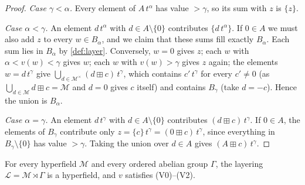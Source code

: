 \documentclass[11pt]{amsart}
\numberwithin{equation}{section}
\newcommand{\hplus}{\boxplus}
\newcommand{\Mas}{\mathcal M}
\newcommand{\Lay}{\mathcal L}
\newcommand{\lt}[2]{#1\,t^{#2}}
\begin{document}
\begin{proof}
\emph{Case $\gamma<\alpha$.} Every element of $\lt{A}{\alpha}$ has value $>\gamma$, so its sum with $z$ is $\{z\}$.

\emph{Case $\alpha<\gamma$.} An element $d\,t^\alpha$ with $d\in A\setminus\{0\}$ contributes $\{d\,t^\alpha\}$. If $0\in A$ we must also add $z$ to every $w\in B_\alpha$, and we claim that these sums fill exactly $B_\alpha$. Each sum lies in $B_\alpha$ by \cref{def:layer}. Conversely, $w=0$ gives $z$; each $w$ with $\alpha<v(w)<\gamma$ gives $w$; each $w$ with $v(w)>\gamma$ gives $z$ again; the elements $w=d\,t^\gamma$ give $\bigcup_{d\in\Mas^\times}\lt{(d\hplus c)}{\gamma}$, which contains $c'\,t^\gamma$ for every $c'\ne 0$ (as $\bigcup_{d\in\Mas}d\hplus c=\Mas$ and $d=0$ gives $c$ itself) and contains $B_\gamma$ (take $d=-c$). Hence the union is $B_\alpha$.

\emph{Case $\alpha=\gamma$.} An element $d\,t^\gamma$ with $d\in A\setminus\{0\}$ contributes $\lt{(d\hplus c)}{\gamma}$. If $0\in A$, the elements of $B_\gamma$ contribute only $z=\lt{\{c\}}{\gamma}=\lt{(0\hplus c)}{\gamma}$, since everything in $B_\gamma\setminus\{0\}$ has value $>\gamma$. Taking the union over $d\in A$ gives $\lt{(A\hplus c)}{\gamma}$.
\end{proof}

\begin{proposition}\label{prop:layer-hf}
For every hyperfield $\Mas$ and every ordered abelian group $\Gamma$, the layering $\Lay=\Mas\rtimes\Gamma$ is a hyperfield, and $v$ satisfies \textup{(V0)--(V2)}.
\end{proposition}
\end{document}
